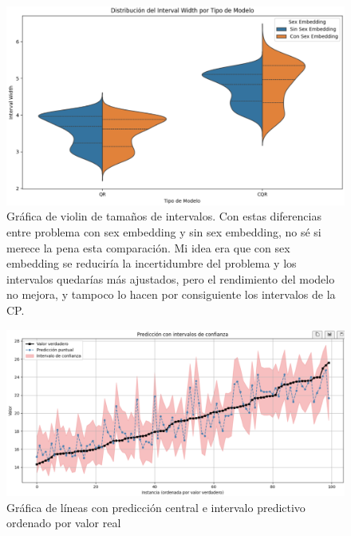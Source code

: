 \begin{figure}[h]
    \centering
    \includegraphics[width=\textwidth]{capitulos/cap_05/imagenes/violin_interval_width.png}
    \caption[
        Gráfica de violin de tamaños de intervalos
    ]{
        Gráfica de violin de tamaños de intervalos.
        Con estas diferencias entre problema con sex embedding y sin sex embedding, no sé si merece la pena
        esta comparación. Mi idea era que con sex embedding se reduciría la incertidumbre del problema y los 
        intervalos quedarías más ajustados, pero el rendimiento del modelo no mejora, y tampoco lo hacen por 
        consiguiente los intervalos de la CP. 
    }
    \label{fig:violin_interval_width}
\end{figure}


\begin{figure}[h]
    \centering
    \includegraphics[width=\textwidth]{capitulos/cap_05/imagenes/conformal_prediction_sorted_by_true.png}
    \caption[
        Gráfica de líneas con predicción central e intervalo predictivo ordenado por valor real
    ]{
        Gráfica de líneas con predicción central e intervalo predictivo ordenado por valor real
    }
    \label{fig:conformal_prediction_sorted_by_true}
\end{figure}

